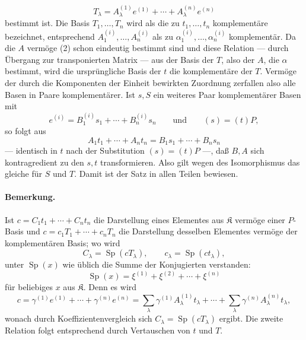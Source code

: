 \[
T_\lambda=A_\lambda^{(1)}e^{(1)}+\cdots+A_\lambda^{(n)}e^{(n)}
\]
bestimmt ist. Die Basis $T_1,\ldots,T_n$ wird als die zu $t_1,\ldots,t_n$ komplementäre bezeichnet, entsprechend $A_1^{(i)},\ldots,A_n^{(i)}$ als zu $\alpha_1^{(i)},\ldots,\alpha_n^{(i)}$ komplementär. Da die $A$ vermöge (2) schon eindeutig bestimmt sind und diese Relation --- durch Übergang zur transponierten Matrix --- aus der Basis der $T$, also der $A$, die $\alpha$ bestimmt, wird die ursprüngliche Basis der $t$ die komplementäre der $T$. Vermöge der durch die Komponenten der Einheit bewirkten Zuordnung zerfallen also alle Basen in Paare komplementärer. Ist $s,S$ ein weiteres Paar komplementärer Basen mit
\[
e^{(i)}=B_1^{(i)}s_1+\cdots+B_n^{(i)}s_n
\qquad\text{und}\qquad (s)=(t)P,
\]
so folgt aus
\[
A_1t_1+\cdots+A_nt_n=B_1s_1+\cdots+B_ns_n
\]
--- identisch in $t$ nach der Substitution $(s)=(t)P$ ---, daß $B,A$ sich kontragredient zu den $s,t$ transformieren. Also gilt wegen des Isomorphismus das gleiche für $S$ und $T$. Damit ist der Satz in allen Teilen bewiesen.

\paragraph{Bemerkung.}
Ist $c=C_1t_1+\cdots+C_nt_n$ die Darstellung eines Elementes aus $\mathfrak K$ vermöge einer $P$-Basis und $c=c_1T_1+\cdots+c_nT_n$ die Darstellung desselben Elementes vermöge der komplementären Basis; wo wird
\[
C_\lambda=\operatorname{Sp}(cT_\lambda),
\qquad c_\lambda=\operatorname{Sp}(ct_\lambda),
\]
unter $\operatorname{Sp}(x)$ wie üblich die Summe der Konjugierten verstanden:
\[
\operatorname{Sp}(x)=\xi^{(1)}+\xi^{(2)}+\cdots+\xi^{(n)}
\]
für beliebiges $x$ aus $\mathfrak K$. Denn es wird
\[
c=\gamma^{(1)}e^{(1)}+\cdots+\gamma^{(n)}e^{(n)}
=\sum_\lambda\gamma^{(1)}A_\lambda^{(1)}t_\lambda+
\cdots+\sum_\lambda\gamma^{(n)}A_\lambda^{(n)}t_\lambda,
\]
wonach durch Koeffizientenvergleich sich $C_\lambda=\operatorname{Sp}(cT_\lambda)$ ergibt. Die zweite Relation folgt entsprechend durch Vertauschen von $t$ und $T$.

